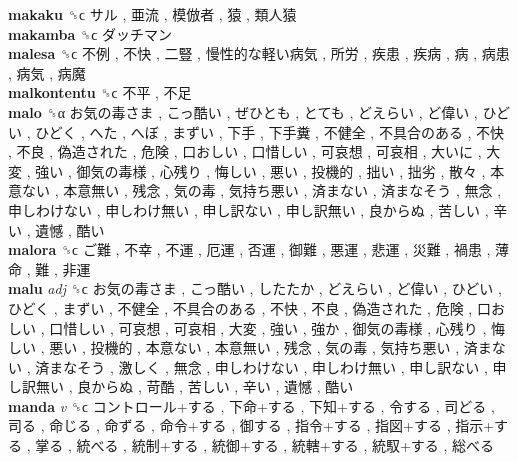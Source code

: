 \textbf{makaku} ␝ϲ   サル ,  亜流 ,  模倣者 ,  猿 ,  類人猿   \\
\textbf{makamba} ␝ϲ   ダッチマン   \\
\textbf{malesa} ␝ϲ   不例 ,  不快 ,  二豎 ,  慢性的な軽い病気 ,  所労 ,  疾患 ,  疾病 ,  病 ,  病患 ,  病気 ,  病魔   \\
\textbf{malkontentu} ␝ϲ   不平 ,  不足   \\
\textbf{malo} ␝α   お気の毒さま ,  こっ酷い ,  ぜひとも ,  とても ,  どえらい ,  ど偉い ,  ひどい ,  ひどく ,  へた ,  へぼ ,  まずい ,  下手 ,  下手糞 ,  不健全 ,  不具合のある ,  不快 ,  不良 ,  偽造された ,  危険 ,  口おしい ,  口惜しい ,  可哀想 ,  可哀相 ,  大いに ,  大変 ,  強い ,  御気の毒様 ,  心残り ,  悔しい ,  悪い ,  投機的 ,  拙い ,  拙劣 ,  散々 ,  本意ない ,  本意無い ,  残念 ,  気の毒 ,  気持ち悪い ,  済まない ,  済まなそう ,  無念 ,  申しわけない ,  申しわけ無い ,  申し訳ない ,  申し訳無い ,  良からぬ ,  苦しい ,  辛い ,  遺憾 ,  酷い   \\
\textbf{malora} ␝ϲ   ご難 ,  不幸 ,  不運 ,  厄運 ,  否運 ,  御難 ,  悪運 ,  悲運 ,  災難 ,  禍患 ,  薄命 ,  難 ,  非運   \\
\textbf{malu} \emph{adj}  ␝ϲ   お気の毒さま ,  こっ酷い ,  したたか ,  どえらい ,  ど偉い ,  ひどい ,  ひどく ,  まずい ,  不健全 ,  不具合のある ,  不快 ,  不良 ,  偽造された ,  危険 ,  口おしい ,  口惜しい ,  可哀想 ,  可哀相 ,  大変 ,  強い ,  強か ,  御気の毒様 ,  心残り ,  悔しい ,  悪い ,  投機的 ,  本意ない ,  本意無い ,  残念 ,  気の毒 ,  気持ち悪い ,  済まない ,  済まなそう ,  激しく ,  無念 ,  申しわけない ,  申しわけ無い ,  申し訳ない ,  申し訳無い ,  良からぬ ,  苛酷 ,  苦しい ,  辛い ,  遺憾 ,  酷い   \\
\textbf{manda} \emph{v}  ␝ϲ   コントロール+する ,  下命+する ,  下知+する ,  令する ,  司どる ,  司る ,  命じる ,  命ずる ,  命令+する ,  御する ,  指令+する ,  指図+する ,  指示+する ,  掌る ,  統べる ,  統制+する ,  統御+する ,  統轄+する ,  統馭+する ,  総べる   \\
